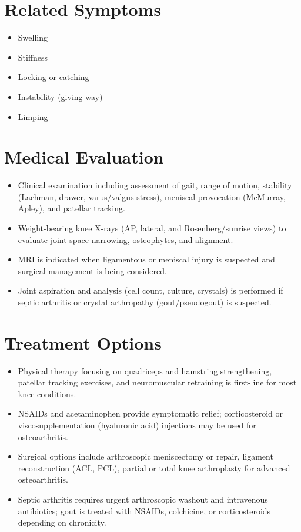 \section*{Related Symptoms}
\begin{itemize}
  \item Swelling
  \item Stiffness
  \item Locking or catching
  \item Instability (giving way)
  \item Limping
\end{itemize}

\section*{Medical Evaluation}
\begin{itemize}
  \item Clinical examination including assessment of gait, range of motion, stability (Lachman, drawer, varus/valgus stress), meniscal provocation (McMurray, Apley), and patellar tracking.
  \item Weight-bearing knee X-rays (AP, lateral, and Rosenberg/sunrise views) to evaluate joint space narrowing, osteophytes, and alignment.
  \item MRI is indicated when ligamentous or meniscal injury is suspected and surgical management is being considered.
  \item Joint aspiration and analysis (cell count, culture, crystals) is performed if septic arthritis or crystal arthropathy (gout/pseudogout) is suspected.
\end{itemize}

\section*{Treatment Options}
\begin{itemize}
  \item Physical therapy focusing on quadriceps and hamstring strengthening, patellar tracking exercises, and neuromuscular retraining is first-line for most knee conditions.
  \item NSAIDs and acetaminophen provide symptomatic relief; corticosteroid or viscosupplementation (hyaluronic acid) injections may be used for osteoarthritis.
  \item Surgical options include arthroscopic meniscectomy or repair, ligament reconstruction (ACL, PCL), partial or total knee arthroplasty for advanced osteoarthritis.
  \item Septic arthritis requires urgent arthroscopic washout and intravenous antibiotics; gout is treated with NSAIDs, colchicine, or corticosteroids depending on chronicity.
\end{itemize}

